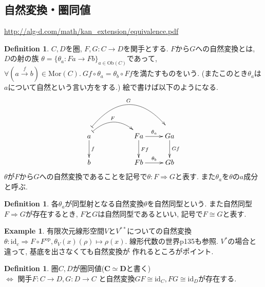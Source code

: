 \documentclass[a4paper,10pt]{article}
\theoremstyle{definition}
\newtheorem{definition}[thm]{\bfseries Definition}
\newtheorem{exmp}[thm]{\bfseries Example}
\begin{document}
\subsection{自然変換・圏同値}
\url{http://alg-d.com/math/kan_extension/equivalence.pdf}
\begin{definition}
    $C,D$を圏, $F,G:C \rightarrow D$を関手とする. $F$から$G$への自然変換とは, $D$の射の族
    $\theta=\{\theta_a: Fa \rightarrow Fb\}_{a\in \mathrm{Ob}(C)}$であって, 
    $\forall (a \xrightarrow{f} b) \in \mathrm{Mor}(C).\ Gf \circ \theta_a = \theta_b \circ Ff$を満たすものをいう. 
    (またこのとき$\theta_a$は$a$について自然という言い方をする.) 絵で書けば以下のようになる. 
    \begin{align*}
\xymatrix{
a\ar@{|->}@/^18pt/@<0.5ex>[rr]^-{F} \ar[d]^-{f} 
\ar@{|->}@/^36pt/@<2.0ex>[rrr]^-{G}& & 
Fa\ar[r]^-{\theta_a} \ar[d]^{Ff}& Ga \ar[d]^-{Gf} \\
b& 
& Fb\ar[r]^-{\theta_b}& Gb
}
    \end{align*}
$\theta$が$F$から$G$への自然変換であることを記号で$\theta: F \Rightarrow G$と表す.
また$\theta_a$を$\theta$の$a$成分と呼ぶ.
\end{definition}
\begin{definition}
    各$\theta_a$が同型射となる自然変換$\theta$を自然同型という. また自然同型
    $F \Rightarrow G$が存在するとき, $F$と$G$は自然同型であるといい,
    記号で$F \cong G$と表す.
\end{definition}
\begin{exmp}
    有限次元線形空間$V$と$V^{**}$についての自然変換$\theta: \mathrm{id}_c 
    \Rightarrow F \circ F^{\mathrm{op}}, \theta_V(x)(\rho) \mapsto \rho(x)$.
    線形代数の世界p135も参照. $V^*$の場合と違って, 基底を出さなくても自然変換が
    作れるところがポイント.
\end{exmp}
\begin{definition}
    圏$C, D$が圏同値($\bm{C \simeq D}$と書く)\\
    $\Longleftrightarrow$ 関手$F: C \rightarrow D, G: D \rightarrow C$
    と自然変換$GF \cong \mathrm{id}_C, FG \cong \mathrm{id}_D$が存在する. 
\end{definition}
\end{document}
